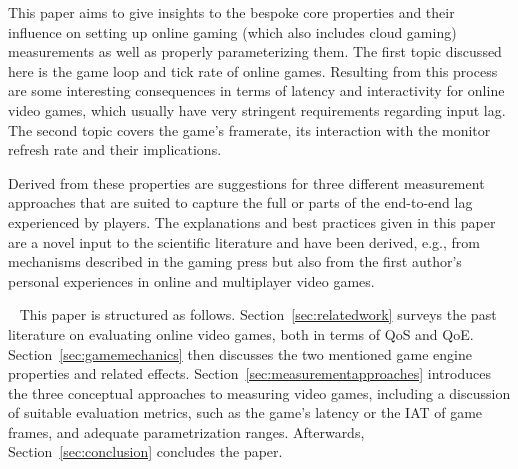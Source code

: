 
This paper aims to give insights to the bespoke core properties and their influence on setting up online gaming (which also includes cloud gaming) measurements as well as properly parameterizing them. The first topic discussed here is the game loop and tick rate of online games. Resulting from this process are some interesting consequences in terms of latency and interactivity for online video games, which usually have very stringent requirements regarding input lag. 
The second topic covers the game's framerate, its interaction with the monitor refresh rate and their implications.

Derived from these properties are suggestions for three different measurement approaches that are suited to capture the full or parts of the end-to-end lag experienced by players. The explanations and best practices given in this paper are a novel input to the scientific literature and have been derived, e.g., from mechanisms described in the gaming press but also from the first author's personal experiences in online and multiplayer video games.

~\newline
This paper is structured as follows. Section~\ref{sec:relatedwork} surveys the past literature on evaluating online video games, both in terms of \gls{QoS} and \gls{QoE}. Section~\ref{sec:gamemechanics} then discusses the two mentioned game engine properties and related effects. Section~\ref{sec:measurementapproaches} introduces the three conceptual approaches to measuring video games, including a discussion of suitable evaluation metrics, such as the game's latency or the \gls{IAT} of game frames, and adequate parametrization ranges. Afterwards, Section~\ref{sec:conclusion} concludes the paper.






